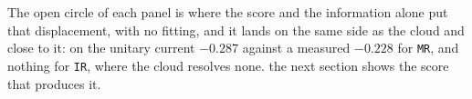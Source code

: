 The open circle of each panel is where the score and the information alone put that displacement,
with no fitting, and it lands on the same side as the cloud and close to it: on the unitary current
$-0.287$ against a measured $-0.228$ for \texttt{MR}, and nothing for \texttt{IR}, where the cloud
resolves none. the next section shows the score that produces it. %
